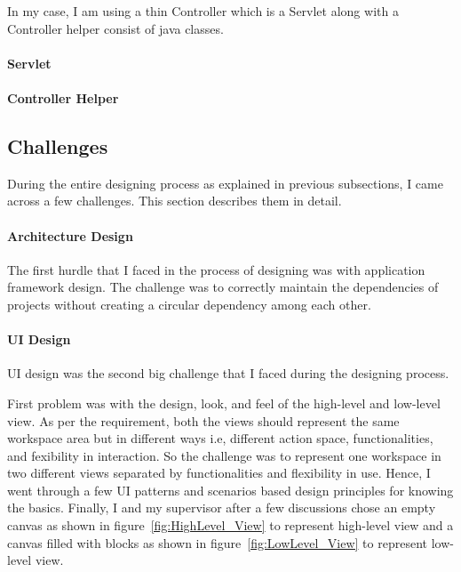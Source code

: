 In my case, I am using a thin Controller which is a Servlet along with a Controller helper consist of java classes.

\paragraph{Servlet}


\paragraph{Controller Helper}

\subsection{Challenges}\label{subsec:designchallenges}
During the entire designing process as explained in previous subsections, I came across a few challenges. This section describes them in detail.

\paragraph{Architecture Design}
The first hurdle that I faced in the process of designing was with application framework design. The challenge was to correctly maintain the dependencies of projects without creating a circular dependency among each other.

\paragraph{UI Design}
UI design was the second big challenge that I faced during the designing process.

First problem was with the design, look, and feel of the high-level and low-level view. As per the requirement, both the views should represent the same workspace area but in different ways i.e, different action space, functionalities, and fexibility in interaction. So the challenge was to represent one workspace in two different views separated by functionalities and flexibility in use. Hence, I went through a few UI patterns \cite{designinterfaces} and scenarios based design principles \cite{scenariobasedui} for knowing the basics. Finally, I and my supervisor after a few discussions chose an empty canvas as shown in figure~\ref{fig:HighLevel_View} to represent high-level view and a canvas filled with blocks as shown in figure~\ref{fig:LowLevel_View} to represent low-level view.

